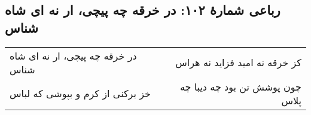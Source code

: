 \begin{center}
\section*{رباعی شمارهٔ ۱۰۲: در خرقه چه پیچی، ار نه ای شاه شناس}
\label{sec:102}
\begin{longtable}{l p{0.5cm} r}
در خرقه چه پیچی، ار نه ای شاه شناس
&&
کز خرقه نه امید فزاید نه هراس
\\
خز برکنی از کرم و بپوشی که لباس
&&
چون پوشش تن بود چه دیبا چه پلاس
\\
\end{longtable}
\end{center}
